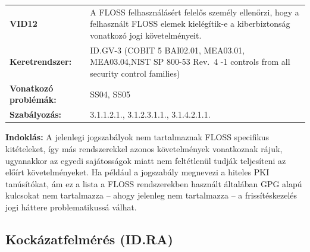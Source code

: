 \documentclass[12pt,magyar,a4paper,oneside]{scrreprt}
\begin{document}
\begin{longtable}[]{@{}ll@{}}
\toprule
\endhead
\begin{minipage}[t]{0.16\columnwidth}\raggedright
\textbf{VID12}\strut
\end{minipage} & \begin{minipage}[t]{0.79\columnwidth}\raggedright
A FLOSS felhasználásért felelős személy ellenőrzi, hogy a felhasznált
FLOSS elemek kielégítik-e a kiberbiztonság vonatkozó jogi
követelményeit.\strut
\end{minipage}\tabularnewline
\begin{minipage}[t]{0.16\columnwidth}\raggedright
\textbf{Keretrendszer:}\strut
\end{minipage} & \begin{minipage}[t]{0.79\columnwidth}\raggedright
ID.GV-3 (COBIT 5 BAI02.01, MEA03.01, MEA03.04,NIST SP 800-53 Rev.~4 -1
controls from all security control families)\strut
\end{minipage}\tabularnewline
\begin{minipage}[t]{0.16\columnwidth}\raggedright
\textbf{Vonatkozó problémák:}\strut
\end{minipage} & \begin{minipage}[t]{0.79\columnwidth}\raggedright
SS04, SS05\strut
\end{minipage}\tabularnewline
\begin{minipage}[t]{0.16\columnwidth}\raggedright
\textbf{Szabályozás:}\strut
\end{minipage} & \begin{minipage}[t]{0.79\columnwidth}\raggedright
3.1.1.2.1., 3.1.2.3.1.1., 3.1.4.2.1.1.\strut
\end{minipage}\tabularnewline
\bottomrule
\end{longtable}

\textbf{Indoklás: } A jelenlegi jogszabályok nem tartalmaznak FLOSS
specifikus kitételeket, így más rendszerekkel azonos követelmények
vonatkoznak rájuk, ugyanakkor az egyedi sajátosságok miatt nem
feltétlenül tudják teljesíteni az előírt követelményeket. Ha például a
jogszabály megnevezi a hiteles PKI tanúsítókat, ám ez a lista a FLOSS
rendszerekben használt általában GPG alapú kulcsokat nem tartalmazza --
ahogy jelenleg nem tartalmazza -- a frissítéskezelés jogi háttere
problematikussá válhat.

\hypertarget{kockuxe1zatfelmuxe9ruxe9s-id.ra}{%
\subsection{Kockázatfelmérés
(ID.RA)}\label{kockuxe1zatfelmuxe9ruxe9s-id.ra}}
\end{document}
